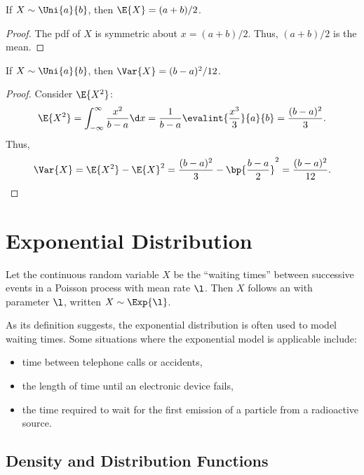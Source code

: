 \begin{proposition}
    If $X \sim \Uni{a}{b}$, then $\E{X} = (a+b)/2$.
\end{proposition}
\begin{proof}
    The pdf of $X$ is symmetric about $x = (a+b)/2$. Thus, $(a+b)/2$ is the mean.
\end{proof}

\begin{proposition}
    If $X \sim \Uni{a}{b}$, then $\Var{X} = (b-a)^2 / 12$.
\end{proposition}
\begin{proof}
    Consider $\E{X^2}$: \[\E{X^2} = \int_{-\infty}^\infty \frac{x^2}{b-a} \d x = \frac1{b-a} \evalint{\frac{x^3}{3}}{a}{b} = \frac{(b-a)^2}{3}.\] Thus, \[\Var{X} = \E{X^2} - \E{X}^2 = \frac{(b-a)^2}{3} - \bp{\frac{b-a}{2}}^2 = \frac{(b-a)^2}{12}.\]
\end{proof}

\section{Exponential Distribution}

\begin{definition}
    Let the continuous random variable $X$ be the ``waiting times'' between successive events in a Poisson process with mean rate $\l$. Then $X$ follows an  with parameter $\l$, written $X \sim \Exp{\l}$.
\end{definition}

As its definition suggests, the exponential distribution is often used to model waiting times. Some situations where the exponential model is applicable include:
\begin{itemize}
    \item time between telephone calls or accidents,
    \item the length of time until an electronic device fails,
    \item the time required to wait for the first emission of a particle from a radioactive source.
\end{itemize}

\subsection{Density and Distribution Functions}


